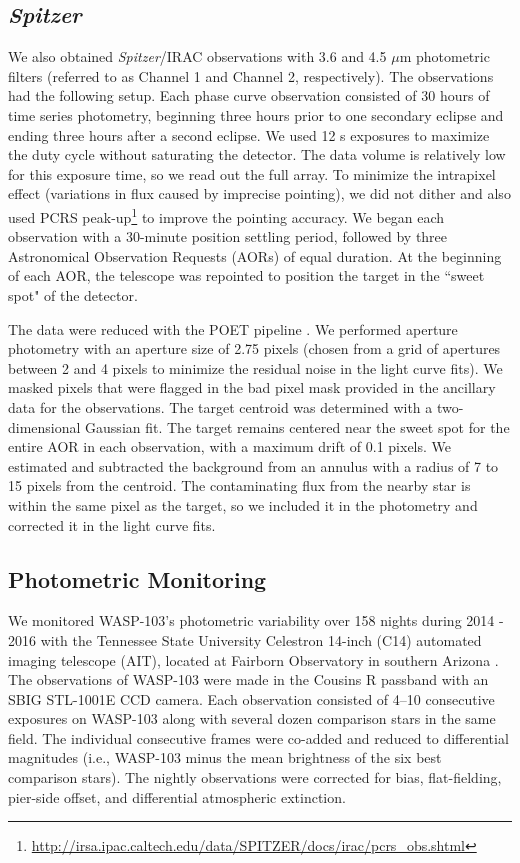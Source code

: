 \documentclass[twocolumn]{aastex61}
\newcommand{\project}[1]{\textsl{#1}}
\newcommand{\Spitzer}{\project{Spitzer}}
\begin{document}
\subsection{\Spitzer}
We also obtained \Spitzer/IRAC observations with 3.6 and 4.5 $\mu$m photometric filters (referred to as Channel 1 and Channel 2, respectively). The observations had the following setup. Each phase curve observation consisted of 30 hours of time series photometry, beginning three hours prior to one secondary eclipse and ending three hours after a second eclipse.  We used 12 s exposures to maximize the duty cycle without saturating the detector. The data volume is relatively low for this exposure time, so we read out the full array. To minimize the intrapixel effect (variations in flux caused by imprecise pointing), we did not dither and also used PCRS peak-up\footnote{\url{http://irsa.ipac.caltech.edu/data/SPITZER/docs/irac/pcrs\_obs.shtml}} to improve the pointing accuracy. We began each observation with a 30-minute position settling period, followed by three Astronomical Observation Requests (AORs) of equal duration. At the beginning of each AOR, the telescope was repointed to position the target in the ``sweet spot" of the detector.

The data were reduced with the POET pipeline \citep{stevenson12}. We performed aperture photometry with an aperture size of 2.75 pixels (chosen from a grid of apertures between 2 and 4 pixels to minimize the residual noise in the light curve fits). We masked pixels that were flagged in the bad pixel mask provided in the ancillary data for the observations. The target centroid was determined with a two-dimensional Gaussian fit.  The target remains centered near the sweet spot for the entire AOR in each observation, with a maximum drift of 0.1 pixels. We estimated and subtracted the background from an annulus with a radius of 7 to 15 pixels from the centroid. The contaminating flux from the nearby star is within the same pixel as the target, so we included it in the photometry and corrected it in the light curve fits.


\subsection{Photometric Monitoring}
We monitored WASP-103's photometric variability over 158 nights during 2014 - 2016 with the Tennessee State University Celestron 14-inch (C14) automated imaging telescope (AIT), located at Fairborn Observatory in southern Arizona \citep[][]{henry99}.  The observations of WASP-103 were made in the Cousins R passband with an SBIG STL-1001E CCD camera.  Each observation consisted of 4--10 consecutive exposures on WASP-103 along with several dozen comparison stars in the same field. The individual consecutive frames were co-added and reduced to differential magnitudes (i.e., WASP-103 minus the mean brightness of the six best comparison stars). The nightly observations were corrected for bias, flat-fielding, pier-side offset, and differential atmospheric extinction.  
\end{document}
